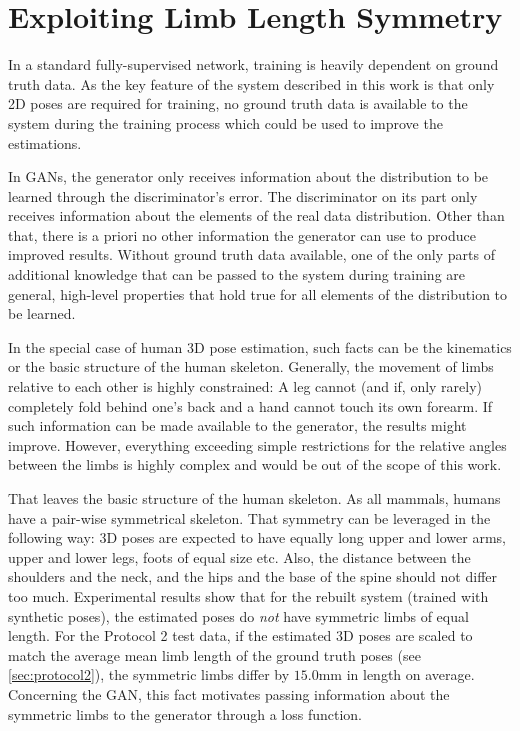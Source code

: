 \section{Exploiting Limb Length Symmetry}
\label{sec:loss-function-modification}

In a standard fully-supervised network, training is heavily dependent on ground truth data.
As the key feature of the system described in this work is that only 2D poses are required for training, no ground truth data is available to the system during the training process which could be used to improve the estimations.

In GANs, the generator only receives information about the distribution to be learned through the discriminator's error.
The discriminator on its part only receives information about the elements of the real data distribution.
Other than that, there is a priori no other information the generator can use to produce improved results.
Without ground truth data available, one of the only parts of additional knowledge that can be passed to the system during training are general, high-level properties that hold true for all elements of the distribution to be learned.

In the special case of human 3D pose estimation, such facts can be the kinematics or the basic structure of the human skeleton.
Generally, the movement of limbs relative to each other is highly constrained:
A leg cannot (and if, only rarely) completely fold behind one's back and a hand cannot touch its own forearm.
If such information can be made available to the generator, the results might improve.
However, everything exceeding simple restrictions for the relative angles between the limbs is highly complex and would be out of the scope of this work.

That leaves the basic structure of the human skeleton.
As all mammals, humans have a pair-wise symmetrical skeleton.
That symmetry can be leveraged in the following way:
3D poses are expected to have equally long upper and lower arms, upper and lower legs, foots of equal size etc.
Also, the distance between the shoulders and the neck, and the hips and the base of the spine should not differ too much.
Experimental results show that for the rebuilt system (trained with synthetic poses), the estimated poses do \emph{not} have symmetric limbs of equal length.
For the Protocol 2 test data, if the estimated 3D poses are scaled to match the average mean limb length of the ground truth poses (see \autoref{sec:protocol2}), the symmetric limbs differ by $15.0$mm in length on average.
Concerning the GAN, this fact motivates passing information about the symmetric limbs to the generator through a loss function.

